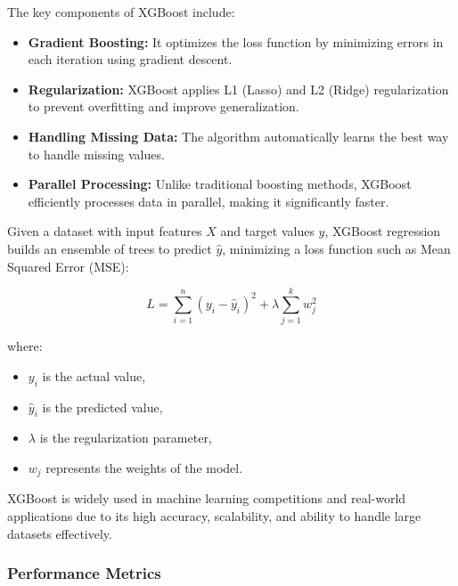 \begin{itemize}
    The key components of XGBoost include:
    
    \begin{itemize}
        \item \textbf{Gradient Boosting:} It optimizes the loss function by minimizing errors in each iteration using gradient descent.
        \item \textbf{Regularization:} XGBoost applies L1 (Lasso) and L2 (Ridge) regularization to prevent overfitting and improve generalization.
        \item \textbf{Handling Missing Data:} The algorithm automatically learns the best way to handle missing values.
        \item \textbf{Parallel Processing:} Unlike traditional boosting methods, XGBoost efficiently processes data in parallel, making it significantly faster.
    \end{itemize}
    
    Given a dataset with input features \( X \) and target values \( y \), XGBoost regression builds an ensemble of trees to predict \( \hat{y} \), minimizing a loss function such as Mean Squared Error (MSE):
    
    \begin{equation}
        L = \sum_{i=1}^{n} (y_i - \hat{y}_i)^2 + \lambda \sum_{j=1}^{k} w_j^2
    \end{equation}
    
    where:
    \begin{itemize}
        \item \( y_i \) is the actual value,
        \item \( \hat{y}_i \) is the predicted value,
        \item \( \lambda \) is the regularization parameter,
        \item \( w_j \) represents the weights of the model.
    \end{itemize}
    
    XGBoost is widely used in machine learning competitions and real-world applications due to its high accuracy, scalability, and ability to handle large datasets effectively.
\end{itemize}

\subsubsection{Performance Metrics}

